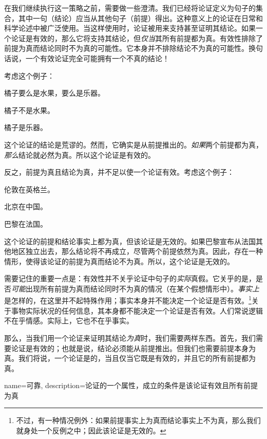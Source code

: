 在我们继续执行这一策略之前，需要做一些澄清。我们已经将论证定义为句子的集合，其中一句（结论）应当从其他句子（前提）得出。这种意义上的论证在日常和科学论述中被广泛使用。当这样使用时，论证被用来支持甚至证明其结论。如果一个论证是有效的，那么它将支持其结论，但\emph{仅当}其所有前提都为真。有效性排除了前提为真而结论同时不为真的可能性。它本身并不排除结论不为真的可能性。换句话说，一个有效论证完全可能拥有一个不真的结论！

考虑这个例子：

\begin{earg}
		\item[] 橘子要么是水果，要么是乐器。
		\item[] 橘子不是水果。
		\item[\texttherefore] 橘子是乐器。
	\end{earg}

这个论证的结论是荒谬的。然而，它确实是从前提推出的。\emph{如果}两个前提都为真，\emph{那么}结论就必然为真。所以这个论证是有效的。

反之，前提为真且结论为真，并不足以使一个论证有效。考虑这个例子：

\begin{earg}
		\item[] 伦敦在英格兰。
		\item[] 北京在中国。
		\item[\texttherefore] 巴黎在法国。
	\end{earg}

这个论证的前提和结论事实上都为真，但该论证是无效的。如果巴黎宣布从法国其他地区独立出去，那么结论将不再成立，尽管两个前提依然为真。因此，存在一种情形，使得该论证的前提为真而结论不为真。所以，这个论证是无效的。

需要记住的重要一点是：有效性并不关乎论证中句子的\emph{实际}真假。它关乎的是，是否\emph{可能}出现所有前提为真而结论同时不为真的情况（在某个假想情形中）。\emph{事实上}是怎样的，在这里并不起特殊作用；事实本身并不能决定一个论证是否有效。\footnote{不过，有一种情况例外：如果前提事实上为真而结论事实上不为真，那么我们就身处一个反例之中；因此该论证是无效的。}关于事物实际状况的任何信息，其本身都不能决定一个论证是否有效。人们常说逻辑不在乎情感。实际上，它也不在乎事实。

那么，当我们用一个论证来证明其结论\emph{为真}时，我们需要两样东西。首先，我们需要论证是有效的；也就是说，结论必须能从前提推出。但我们也需要前提本身为真。我们将说，一个论证是的，当且仅当它既是有效的，并且它的所有前提都为真。

{
name={可靠},
description={论证的一个属性，成立的条件是该论证有效且所有前提为真}
}

